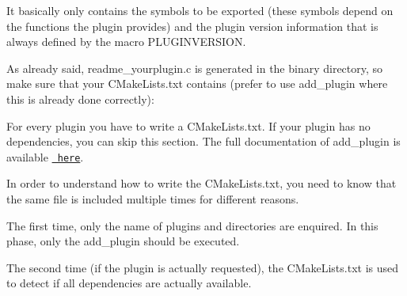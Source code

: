 \begin{DoxyCode}{0}
\DoxyCodeLine{\}}
\end{DoxyCode}


It basically only contains the symbols to be exported (these symbols depend on the functions the plugin provides) and the plugin version information that is always defined by the macro {\ttfamily P\+L\+U\+G\+I\+N\+V\+E\+R\+S\+I\+ON}.

As already said, {\ttfamily readme\+\_\+yourplugin.\+c} is generated in the binary directory, so make sure that your {\ttfamily C\+Make\+Lists.\+txt} contains (prefer to use {\ttfamily add\+\_\+plugin} where this is already done correctly)\+:


\begin{DoxyCode}{0}
\end{DoxyCode}


For every plugin you have to write a {\ttfamily C\+Make\+Lists.\+txt}. If your plugin has no dependencies, you can skip this section. The full documentation of {\ttfamily add\+\_\+plugin} is available \href{/home/mpranj/workspace/libelektra/scripts/cmake/Modules/LibAddPlugin.cmake}{\texttt{ here}}.

In order to understand how to write the {\ttfamily C\+Make\+Lists.\+txt}, you need to know that the same file is included multiple times for different reasons.


\begin{DoxyEnumerate}
\item The first time, only the name of plugins and directories are enquired. In this phase, only the {\ttfamily add\+\_\+plugin} should be executed.
\item The second time (if the plugin is actually requested), the {\ttfamily C\+Make\+Lists.\+txt} is used to detect if all dependencies are actually available.
\end{DoxyEnumerate}

